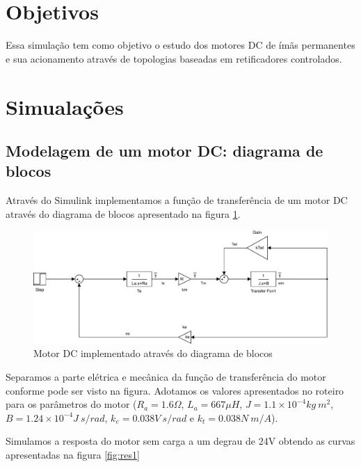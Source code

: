 \documentclass{article}
\begin{document}


\onehalfspacing
\section{Objetivos}
	Essa simulação tem como objetivo o estudo dos motores DC de ímãs permanentes e sua acionamento através de topologias baseadas em retificadores controlados.
	 
\section{Simualações}
\subsection{Modelagem de um motor DC: diagrama de blocos}
Através do Simulink implementamos a função de transferência de um motor DC através do diagrama de blocos apresentado na figura \ref{fig:sim1}.
\begin{figure}[H]
	\centering
	\includegraphics[width=\linewidth]{matlab/sim1}
	\caption{Motor DC implementado através do diagrama de blocos}
	\label{fig:sim1}
\end{figure}
Separamos a parte elétrica e mecânica da função de transferência do motor conforme pode ser visto na figura. Adotamos os valores apresentados no roteiro para os parâmetros do motor ($R_a = 1.6 \Omega$, $L_a = 667 \mu H$, $J = 1.1 \times 10^{-4} kg\ m^2$, $B = 1.24 \times 10^{-4} J\ s/rad$, $k_e = 0.038 V\ s/rad$ e $k_t = 0.038 N\ m/A$).

Simulamos a resposta do motor sem carga a um degrau de 24V obtendo as curvas apresentadas na figura \ref{fig:res1}
\end{document}
